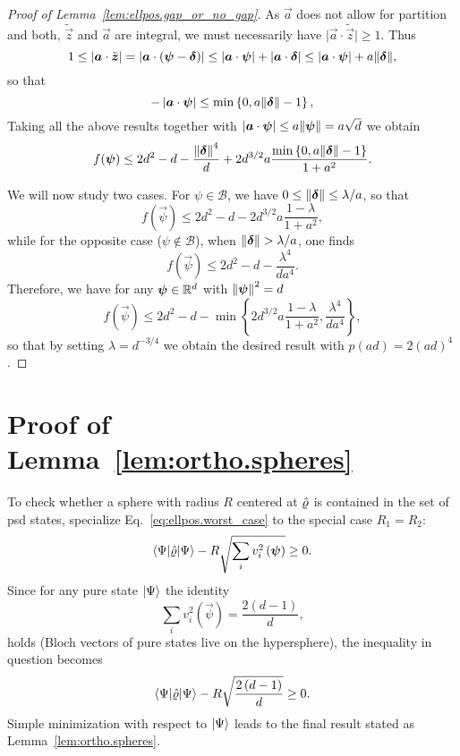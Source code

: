 \begin{proof}[Proof of Lemma~\ref{lem:ellpos.gap_or_no_gap}]
As $\vec a$ does not allow for partition and both, $\tilde{\vec z}$ and $\vec a$ are integral, we must necessarily have $\vert \vec a \cdot \tilde{\vec z} \vert \geq 1$. Thus
\[
1\leq\left|\boldsymbol{a}\cdot\tilde{{\boldsymbol{z}}}\right|=\left|\boldsymbol{a}\cdot\left(\boldsymbol{\psi}-\boldsymbol{\delta}\right)\right|\leq\left|\boldsymbol{a}\cdot\boldsymbol{\psi}\right|+\left|\boldsymbol{a}\cdot\boldsymbol{\delta}\right|\leq\left|\boldsymbol{a}\cdot\boldsymbol{\psi}\right|+a{\Vert\boldsymbol{\delta}\Vert},
\]
so that
\[
-\left|\boldsymbol{a}\cdot\boldsymbol{\psi}\right|\leq\min\left\{0,a{\Vert\boldsymbol{\delta}\Vert}-1\right\},
\]
Taking all the above results together with $\left|\boldsymbol{a}\cdot\boldsymbol{\psi}\right|\leq a{\Vert\boldsymbol{\psi}\Vert}=a\sqrt{d}$ we obtain
\[
f({\boldsymbol{\psi}})\leq 2d^{2}-d-\frac{{\Vert{\boldsymbol{\delta}}\Vert}^4}{d}+2 d^{3/2}a\frac{\min\left\{0,a{\Vert\boldsymbol{\delta}\Vert}-1\right\}}{1+a^{2}}.
\]

We will now study two cases. For $\psi \in \mathcal{B}$, we have $0\leq{\Vert{\boldsymbol{\delta}}\Vert}\leq\lambda/a$, so that
\[
f(\vec \psi)\leq 2d^{2}-d-2 d^{3/2}a\frac{1-\lambda}{1+a^{2}},
\]
while for the opposite case ($\psi \notin \mathcal{B}$), when  ${\Vert{\boldsymbol{\delta}}\Vert}>\lambda/a$, one finds
 \[
f(\vec \psi)\leq 2d^{2}-d-\frac{\lambda^4}{d a^4}.
\]
Therefore, we have for any ${\boldsymbol{\psi}} \in {\mathbb{R}}^d$ with ${\Vert{\boldsymbol{\psi}}\Vert}^2 = d$
\[
f(\vec \psi)\leq 2d^{2}-d- \min\left\{2 d^{3/2}a\frac{1-\lambda}{1+a^{2}},\frac{\lambda^4}{d a^4}\right\},
\]
so that by setting $\lambda=d^{-3/4}$ we obtain the desired result with $p(ad)=2{(ad)}^4$.
\end{proof}




\section{Proof of Lemma~\ref{lem:ortho.spheres}}
\label{sec:error.spheres}


To check whether a sphere with radius $R$ centered at $\hat{\varrho}$ is contained in the set of psd states, specialize Eq.~\eqref{eq:ellpos.worst_case} to the special case $R_1 = R_2$:
\[
  \bra{\Psi}\estim{\varrho} \ket{\Psi} -R\sqrt{\sum_{i}v_{i}^2\left(\vec\psi\right)}\geq0.
 \label{eq:spheres.worst_case}
\]
Since for any pure state $ \ket{\Psi} $ the identity
\[
  \sum_{i}v_{i}^{2}\left(\vec\psi\right)=\frac{2\left(d-1\right)}{d},\label{puresum-1}
\]
holds (Bloch vectors of pure states live on the hypersphere), the inequality in question becomes
\[
  \bra{\Psi}\estim{\varrho} \ket{\Psi} -R\sqrt{\frac{2\left(d-1\right)}{d}}\geq0.
\]
Simple minimization with respect to $ \ket{\Psi} $ leads to the final result stated as Lemma~\ref{lem:ortho.spheres}.



